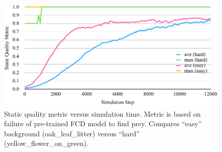 \documentclass[letterpaper]{article}
\begin{document}


\begin{figure}
    \includegraphics[width=\columnwidth]{SQM_plot_easy_vs_hard.pdf}
    \caption{Static quality metric versus simulation time. Metric is based on failure of pre-trained FCD model to find prey. Compares “easy” background (oak\_leaf\_litter) versus “hard” (yellow\_flower\_on\_green).}
    \label{fig:sqm_plot}
\end{figure}


\end{document}
